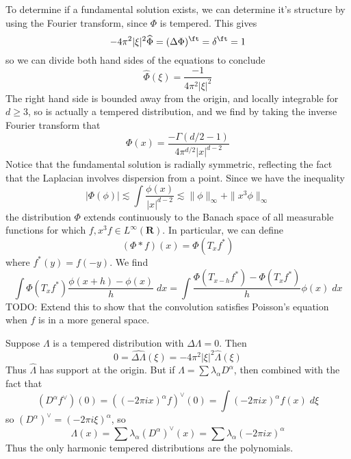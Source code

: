 To determine if a fundamental solution exists, we can determine it's structure by using the Fourier transform, since $\Phi$ is tempered. This gives
%
\[ - 4 \pi^2 |\xi|^2 \widehat{\Phi} = (\Delta \Phi)^\ft = \delta^\ft = 1 \]
%
so we can divide both hand sides of the equations to conclude
%
\[ \widehat{\Phi}(\xi) = \frac{-1}{4 \pi^2 |\xi|^2} \]
%
The right hand side is bounded away from the origin, and locally integrable for $d \geq 3$, so is actually a tempered distribution, and we find by taking the inverse Fourier transform that
%
\[ \Phi(x) = \frac{- \Gamma(d/2 - 1)}{4 \pi^{d/2} |x|^{d - 2}} \]
%
Notice that the fundamental solution is radially symmetric, reflecting the fact that the Laplacian involves dispersion from a point. Since we have the inequality
%
\[ |\Phi(\phi)| \lesssim \int \frac{\phi(x)}{|x|^{d-2}} \lesssim \| \phi \|_\infty + \| x^3 \phi \|_\infty \]
%
the distribution $\Phi$ extends continuously to the Banach space of all measurable functions for which $f, x^3 f \in L^\infty(\mathbf{R})$. In particular, we can define
%
\[ (\Phi * f)(x) = \Phi(T_x f^*) \]
%
where $f^*(y) = f(-y)$. We find
%
\[ \int \Phi(T_x f^*) \frac{\phi(x+h) - \phi(x)}{h}\; dx = \int \frac{\Phi(T_{x-h} f^*) - \Phi(T_x f^*)}{h} \phi(x)\; dx \]
%
TODO: Extend this to show that the convolution satisfies Poisson's equation when $f$ is in a more general space.

\begin{example}
    Suppose $\Lambda$ is a tempered distribution with $\Delta \Lambda = 0$. Then
    \[ 0 = \widehat{\Delta \Lambda}(\xi) = - 4 \pi^2 |\xi|^2 \widehat{\Lambda}(\xi) \]
    Thus $\widehat{\Lambda}$ has support at the origin. But if $\widehat{\Lambda} = \sum \lambda_\alpha D^\alpha$, then combined with the fact that
    \[ (D^\alpha f^\vee)(0) = ((-2 \pi i x)^\alpha f)^\vee(0) = \int (- 2 \pi i x)^\alpha f(x)\; d\xi \]
    so $(D^\alpha)^\vee = (- 2 \pi i \xi)^\alpha$, so
    \[ \Lambda(x) = \sum \lambda_\alpha (D^\alpha)^\vee(x) = \sum \lambda_\alpha (- 2 \pi i x)^\alpha \]
    Thus the only harmonic tempered distributions are the polynomials.
\end{example}

